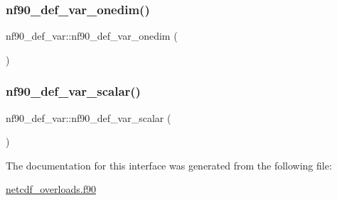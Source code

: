 \mbox{\label{interfacenf90__def__var_a1110d6ddd2f2cd73cd364e4323891b55}} 
\subsubsection{\texorpdfstring{nf90\+\_\+def\+\_\+var\+\_\+onedim()}{nf90\_def\_var\_onedim()}}
{\footnotesize\ttfamily nf90\+\_\+def\+\_\+var\+::nf90\+\_\+def\+\_\+var\+\_\+onedim (\begin{DoxyParamCaption}{ }\end{DoxyParamCaption})}

\mbox{\label{interfacenf90__def__var_af29045212f1a72967d97e311f3489ad7}} 
\subsubsection{\texorpdfstring{nf90\+\_\+def\+\_\+var\+\_\+scalar()}{nf90\_def\_var\_scalar()}}
{\footnotesize\ttfamily nf90\+\_\+def\+\_\+var\+::nf90\+\_\+def\+\_\+var\+\_\+scalar (\begin{DoxyParamCaption}{ }\end{DoxyParamCaption})}



The documentation for this interface was generated from the following file\+:\begin{DoxyCompactItemize}
\item 
\hyperlink{netcdf__overloads_8f90}{netcdf\+\_\+overloads.\+f90}\end{DoxyCompactItemize}
